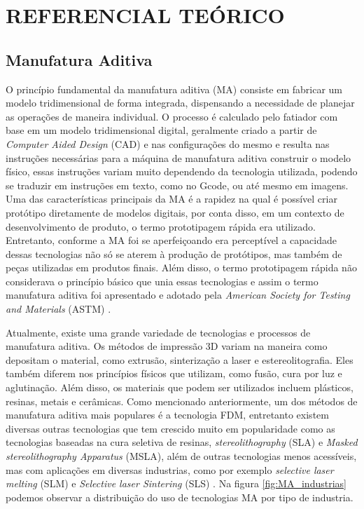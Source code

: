 \chapter{REFERENCIAL TEÓRICO}

\section{Manufatura Aditiva}
O princípio fundamental da manufatura aditiva (MA) consiste em fabricar um modelo tridimensional de forma 
integrada, dispensando a necessidade de planejar as operações de maneira individual.
O processo é calculado pelo fatiador com base em um modelo tridimensional digital,
geralmente criado a partir de \textit{Computer Aided Design} (CAD) e nas configurações do mesmo
e resulta nas instruções necessárias para a máquina de manufatura aditiva construir o modelo físico, essas instruções variam muito dependendo da tecnologia utilizada, podendo se traduzir em instruções em texto, como no Gcode, ou até mesmo em imagens.
Uma das características 
principais da MA é a rapidez na qual é possível criar protótipo
diretamente de modelos digitais, por conta disso, em um contexto 
de desenvolvimento de produto, o termo prototipagem rápida era 
utilizado. Entretanto, conforme a MA foi se aperfeiçoando era 
perceptível a capacidade dessas tecnologias não só se aterem à 
produção de protótipos, mas também de peças utilizadas em 
produtos finais. Além disso, o termo prototipagem rápida não considerava o princípio 
básico que unia essas tecnologias e assim o termo manufatura 
aditiva foi apresentado e adotado pela \textit{American Society for 
Testing and Materials} (ASTM) \cite{gibson15}.

Atualmente, existe uma grande variedade de tecnologias e processos de manufatura aditiva.
Os métodos de impressão 3D variam na maneira como depositam o material, como extrusão, sinterização a 
laser e estereolitografia. Eles também diferem nos princípios físicos que utilizam, como fusão, cura por luz
e aglutinação. Além disso, os materiais que podem ser utilizados incluem plásticos, resinas, metais e cerâmicas. 
Como mencionado anteriormente, um dos métodos de manufatura aditiva mais populares
é a tecnologia FDM, entretanto existem diversas outras tecnologias que tem crescido muito em popularidade
como as tecnologias baseadas na cura seletiva de resinas, \textit{stereolithography} (SLA) e \textit{Masked stereolithography Apparatus} (MSLA),
além de outras tecnologias menos acessíveis, mas com aplicações em diversas industrias, como por exemplo
\textit{selective laser melting} (SLM) e \textit{Selective laser Sintering} (SLS) \cite{bikas16}.  
Na figura \ref{fig:MA_industrias} podemos observar a distribuição do uso de 
tecnologias MA por tipo de industria.   

